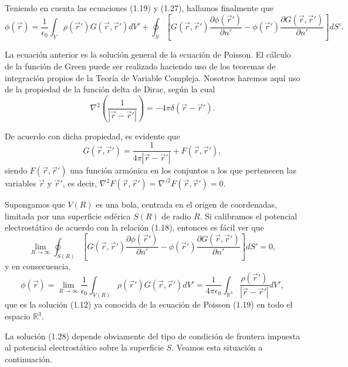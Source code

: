 \documentclass[12pt,a4paper]{book}
\begin{document}
Teniendo en cuenta las ecuaciones (1.19) y (1.27), hallamos finalmente que
\begin{equation}
\phi(\vec{r}) = \frac{1}{\epsilon_0} \int_V \rho(\vec{r}')G(\vec{r},\vec{r}')dV' + \oint_S \left[ G(\vec{r},\vec{r}')\frac{\partial\phi(\vec{r}')}{\partial n'} - \phi(\vec{r}')\frac{\partial G(\vec{r},\vec{r}')}{\partial n'} \right] dS'.
\end{equation}

La ecuación anterior es la solución general de la ecuación de Poisson. El cálculo de la función de Green puede ser realizado haciendo uso de los teoremas de integración propios de la Teoría de Variable Compleja. Nosotros haremos aquí uso de la propiedad de la función delta de Dirac, según la cual
\begin{equation}
\nabla^2\left( \frac{1}{|\vec{r} - \vec{r}'|} \right) = -4\pi \delta(\vec{r} - \vec{r}').
\end{equation}

De acuerdo con dicha propiedad, es evidente que
\begin{equation}
G(\vec{r},\vec{r}') = \frac{1}{4\pi|\vec{r} - \vec{r}'|} + F(\vec{r},\vec{r}'),
\end{equation}
siendo $F(\vec{r},\vec{r}')$ una función armónica en los conjuntos a los que pertenecen las variables $\vec{r}$ y $\vec{r}'$, es decir, $\nabla^2F(\vec{r},\vec{r}') = \nabla'^2 F(\vec{r},\vec{r}') = 0$.

Supongamos que $V(R)$ es una bola, centrada en el origen de coordenadas, limitada por una superficie esférica $S(R)$ de radio $R$. Si calibramos el potencial electrostático de acuerdo con la relación (1.18), entonces es fácil ver que
\begin{equation}
\lim_{R\to\infty} \oint_{S(R)} \left[ G(\vec{r},\vec{r}')\frac{\partial\phi(\vec{r}')}{\partial n'} - \phi(\vec{r}')\frac{\partial G(\vec{r},\vec{r}')}{\partial n'} \right] dS' = 0,
\end{equation}
y en consecuencia,
\begin{equation}
\phi(\vec{r}) = \lim_{R\to\infty} \frac{1}{\epsilon_0} \int_{V(R)} \rho(\vec{r}')G(\vec{r},\vec{r}')dV' = \frac{1}{4\pi\epsilon_0} \int_{\mathbb{R}^3} \frac{\rho(\vec{r}')}{|\vec{r} - \vec{r}'|}dV',
\end{equation}
que es la solución (1.12) ya conocida de la ecuación de Poisson (1.19) en todo el espacio $\mathbb{R}^3$.

La solución (1.28) depende obviamente del tipo de condición de frontera impuesta al potencial electrostático sobre la superficie $S$. Veamos esta situación a continuación.
\end{document}

